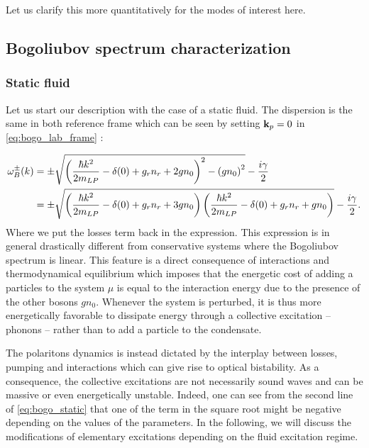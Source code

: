 Let us clarify this more quantitatively for the modes of interest here.

\subsection{Bogoliubov spectrum characterization}
 
\subsubsection{Static fluid}
Let us start our description with the case of a static fluid. The dispersion is the same in both reference frame which can be seen by setting $\mathbf{k}_p=0$ 
in \autoref{eq:bogo_lab_frame} :

\begin{equation}
    \begin{aligned}
    \omega^\pm_B(k)&= \pm\sqrt{\left(\dfrac{\hbar k^2}{2m_{LP}}-\delta(0)+ g_rn_r +2g n_0\right)^2 - \left(g n_0\right)^2}-\dfrac{i\gamma}{2} \\
                   &= \pm\sqrt{\left(\dfrac{\hbar k^2}{2m_{LP}}-\delta(0)+ g_rn_r +3g n_0\right)\left(\dfrac{\hbar k^2}{2m_{LP}}-\delta(0)+ g_rn_r +g n_0\right)}-\dfrac{i\gamma}{2}.
    \label{eq:bogo_static}
    \end{aligned}
\end{equation}
Where we put the losses term back in the expression. 
This expression is in general drastically different from conservative systems where the Bogoliubov spectrum is linear. This feature is a direct consequence of 
interactions and thermodynamical equilibrium which imposes that the energetic cost of adding a particles to the system $\mu$ is equal
to the interaction energy due to the presence of the other bosons $gn_0$. Whenever the system is perturbed, it is thus more energetically favorable 
to dissipate energy through a collective excitation -- phonons -- rather than to add a particle to the condensate.

\bigskip

The polaritons dynamics is instead dictated by the interplay between losses, pumping and interactions which can give rise to optical bistability. As a consequence, the 
collective excitations are not necessarily sound waves and can be massive or even energetically unstable. Indeed, one can see from the 
second line of \autoref{eq:bogo_static} that one of the term in the square root might be negative depending on the values of the parameters. In the following,
we will discuss the modifications of elementary excitations depending on the fluid excitation regime.

